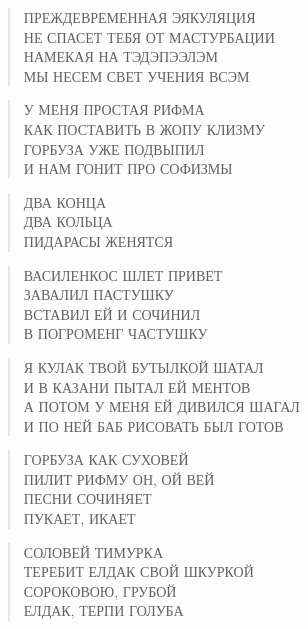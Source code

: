 \poemtitle{***}
\begin{verse}
ПРЕЖДЕВРЕМЕННАЯ ЭЯКУЛЯЦИЯ\\
НЕ СПАСЕТ ТЕБЯ ОТ МАСТУРБАЦИИ\\
НАМЕКАЯ НА ТЭДЭПЭЭЛЭМ\\
МЫ НЕСЕМ СВЕТ УЧЕНИЯ ВСЭМ
\end{verse}

\poemtitle{***}
\begin{verse}
У МЕНЯ ПРОСТАЯ РИФМА\\
КАК ПОСТАВИТЬ В ЖОПУ КЛИЗМУ\\
ГОРБУЗА УЖЕ ПОДВЫПИЛ\\
И НАМ ГОНИТ ПРО СОФИЗМЫ
\end{verse}

\poemtitle{***}
\begin{verse}
ДВА КОНЦА\\
ДВА КОЛЬЦА\\
ПИДАРАСЫ ЖЕНЯТСЯ
\end{verse}

\poemtitle{***}
\begin{verse}
ВАСИЛЕНКОС ШЛЕТ ПРИВЕТ\\
ЗАВАЛИЛ ПАСТУШКУ\\
ВСТАВИЛ ЕЙ И СОЧИНИЛ\\
В ПОГРОМЕНГ ЧАСТУШКУ
\end{verse}

\poemtitle{***}
\begin{verse}
Я КУЛАК ТВОЙ БУТЫЛКОЙ ШАТАЛ\\
И В КАЗАНИ ПЫТАЛ ЕЙ МЕНТОВ\\
А ПОТОМ У МЕНЯ ЕЙ ДИВИЛСЯ ШАГАЛ\\
И ПО НЕЙ БАБ РИСОВАТЬ БЫЛ ГОТОВ
\end{verse}

\poemtitle{***}
\begin{verse}
ГОРБУЗА КАК СУХОВЕЙ\\
ПИЛИТ РИФМУ ОН, ОЙ ВЕЙ\\
ПЕСНИ СОЧИНЯЕТ\\
ПУКАЕТ, ИКАЕТ
\end{verse}

\poemtitle{***}
\begin{verse}
СОЛОВЕЙ ТИМУРКА\\
ТЕРЕБИТ ЕЛДАК СВОЙ ШКУРКОЙ\\
СОРОКОВОЮ, ГРУБОЙ\\
ЕЛДАК, ТЕРПИ ГОЛУБА
\end{verse}

